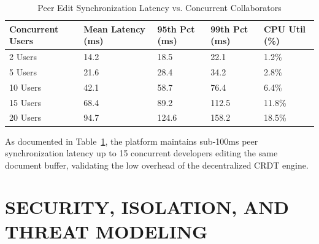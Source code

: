 \documentclass[12pt,a4paper]{report}
\begin{document}
	\begin{table}[H]
		\centering
		\small
		\caption{Peer Edit Synchronization Latency vs. Concurrent Collaborators}
		\label{tab:latency_benchmarks}
		\begin{tabularx}{\linewidth}{@{}XXXXX@{}}
			\toprule
			\textbf{Concurrent Users} & \textbf{Mean Latency (ms)} & \textbf{95th Pct (ms)} & \textbf{99th Pct (ms)} & \textbf{CPU Util (\%)} \\ \midrule
			2 Users & 14.2 & 18.5 & 22.1 & 1.2\% \\
			5 Users & 21.6 & 28.4 & 34.2 & 2.8\% \\
			10 Users & 42.1 & 58.7 & 76.4 & 6.4\% \\
			15 Users & 68.4 & 89.2 & 112.5 & 11.8\% \\
			20 Users & 94.7 & 124.6 & 158.2 & 18.5\% \\ \bottomrule
		\end{tabularx}
	\end{table}
	
	As documented in Table~\ref{tab:latency_benchmarks}, the platform maintains sub-100ms peer synchronization latency up to 15 concurrent developers editing the same document buffer, validating the low overhead of the decentralized CRDT engine.
	
	\chapter{SECURITY, ISOLATION, AND THREAT MODELING}
	
\end{document}
